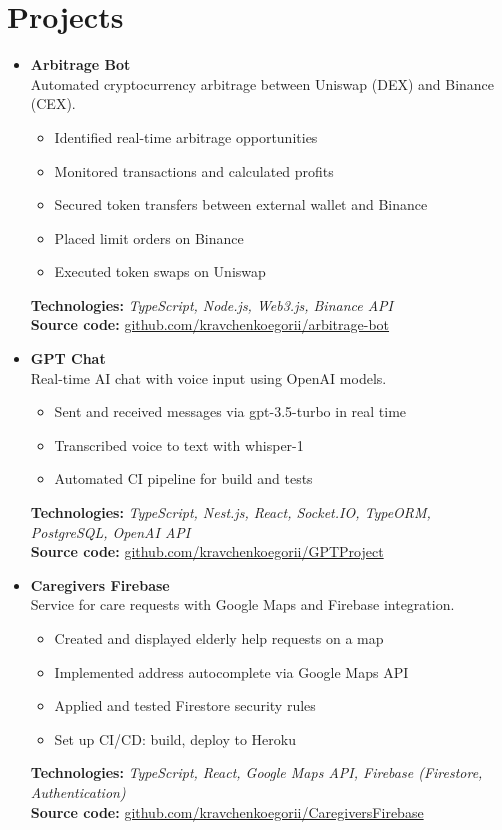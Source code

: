 \section{Projects}\label{sec:projects}
\begin{itemize}[noitemsep]
    \item \textbf{Arbitrage Bot} \\
    Automated cryptocurrency arbitrage between Uniswap (DEX) and Binance (CEX).
    \begin{itemize}[noitemsep]
        \item Identified real-time arbitrage opportunities
        \item Monitored transactions and calculated profits
        \item Secured token transfers between external wallet and Binance
        \item Placed limit orders on Binance
        \item Executed token swaps on Uniswap
    \end{itemize}
    \textbf{Technologies:} \textit{TypeScript, Node.js, Web3.js, Binance API} \\
    \textbf{Source code:} \href{https://github.com/kravchenkoegorii/arbitrage-bot}{github.com/kravchenkoegorii/arbitrage-bot}

    \item \textbf{GPT Chat} \\
    Real-time AI chat with voice input using OpenAI models.
    \begin{itemize}[noitemsep]
        \item Sent and received messages via gpt-3.5-turbo in real time
        \item Transcribed voice to text with whisper-1
        \item Automated CI pipeline for build and tests
    \end{itemize}
    \textbf{Technologies:} \textit{TypeScript, Nest.js, React, Socket.IO, TypeORM, PostgreSQL, OpenAI API} \\
    \textbf{Source code:} \href{https://github.com/kravchenkoegorii/GPTProject}{github.com/kravchenkoegorii/GPTProject}

    \item \textbf{Caregivers Firebase} \\
    Service for care requests with Google Maps and Firebase integration.
    \begin{itemize}[noitemsep]
        \item Created and displayed elderly help requests on a map
        \item Implemented address autocomplete via Google Maps API
        \item Applied and tested Firestore security rules
        \item Set up CI/CD: build, deploy to Heroku
    \end{itemize}
    \textbf{Technologies:} \textit{TypeScript, React, Google Maps API, Firebase (Firestore, Authentication)} \\
    \textbf{Source code:} \href{https://github.com/kravchenkoegorii/CaregiversFirebase}{github.com/kravchenkoegorii/CaregiversFirebase}
\end{itemize}
